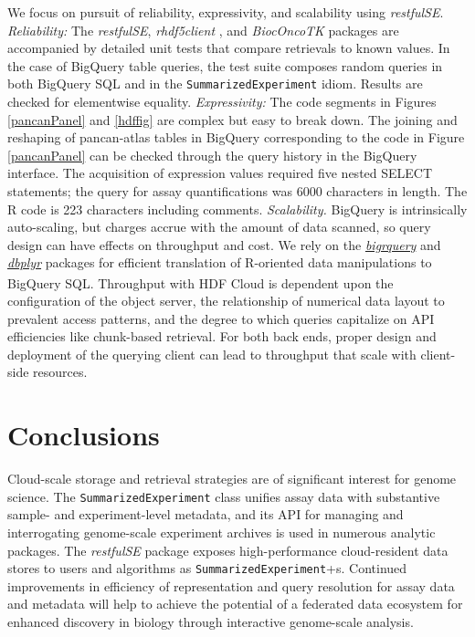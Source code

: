 \documentclass[applications]{gen-bioinformatics}
\newcommand{\Biocpackage}[1]{{\textit{#1}}}
\newcommand{\CRANpackage}[1]{{\emph{\href{https://cran.r-project.org/web/packages/#1/index.html}{#1}}}}
\newcommand{\CRANpackageFirst}[1]{{\emph{\href{https://cran.r-project.org/web/packages/#1/index.html}{#1\textsubscript{\faExternalLink}}}}}
\newcommand{\Rclass}[1]{{\texttt{#1}}}
\begin{document}
We focus on pursuit of reliability,
expressivity, and scalability using \Biocpackage{restfulSE}.  
\textit{Reliability:} 
The \Biocpackage{restfulSE}, \Biocpackage{rhdf5client} \citep{rclient},
and \Biocpackage{BiocOncoTK} \citep{bionc} packages are accompanied by detailed unit
tests that compare retrievals to known values.  In the
case of BigQuery table queries, the test
suite composes random queries 
in both BigQuery SQL and in the \texttt{SummarizedExperiment} 
idiom.  Results
are checked for elementwise equality.  \textit{Expressivity:} The code
segments in Figures \ref{pancanPanel} and \ref{hdffig} are
complex but easy to break down.  The joining and
reshaping of pancan-atlas tables in BigQuery corresponding
to the code in Figure \ref{pancanPanel}
can be checked through the query history in the BigQuery
interface.  The acquisition of expression values required
five nested SELECT statements; the query for assay quantifications
was 6000 characters in length.
The R code is 223 characters including comments.
\textit{Scalability.}  BigQuery is intrinsically auto-scaling,
but charges accrue with the amount of data scanned, 
so query design can have effects on throughput
and cost.  We rely on the \CRANpackage{bigrquery} \citep{bigr} and \CRANpackageFirst{dbplyr} \citep{dbp} packages for
efficient translation of R-oriented data manipulations to 
BigQuery SQL.  Throughput with HDF Cloud 
is dependent upon the configuration of the object server,
the relationship of numerical data layout to prevalent access
patterns, and the degree to which queries capitalize on
API efficiencies like chunk-based retrieval.  For both
back ends, proper design and deployment of the querying client can
lead to throughput that scale with client-side resources.

\section*{Conclusions}

Cloud-scale storage and retrieval strategies are of significant
interest for genome science.  The \Rclass{SummarizedExperiment} class
unifies assay data with substantive sample- and experiment-level
metadata, and its API for managing and interrogating
genome-scale experiment archives is used in numerous
analytic packages.  The \Biocpackage{restfulSE} package exposes high-performance
cloud-resident data stores to users and
algorithms as \texttt{SummarizedExperiment}+s.  Continued improvements
in efficiency of
representation and query resolution for assay data and metadata
will help to achieve the potential of a federated data ecosystem for
enhanced discovery in biology through interactive genome-scale analysis.
\end{document}

